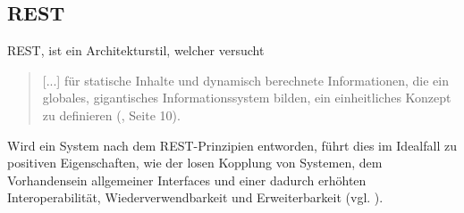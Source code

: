 \subsection{\acs{REST}}\label{section:rest}
\ac{REST}, ist ein Architekturstil, welcher versucht 
\begin{quotation}
[...] für statische Inhalte und dynamisch berechnete Informationen, die ein globales, gigantisches Informationssystem bilden, ein einheitliches Konzept zu definieren (\cite{tilkovrest}, Seite 10).
\end{quotation}
Wird ein System nach dem \ac{REST}-Prinzipien entworden, führt dies im Idealfall zu positiven Eigenschaften, wie der losen Kopplung von Systemen, dem Vorhandensein allgemeiner Interfaces und einer dadurch erhöhten Interoperabilität, Wiederverwendbarkeit und Erweiterbarkeit (vgl. \cite {tilkovrest}).

